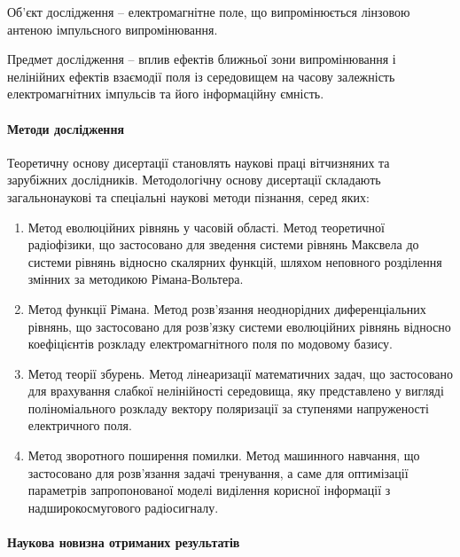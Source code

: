 Об’єкт дослідження -- електромагнітне поле, що випромінюється лінзовою антеною 
імпульсного випромінювання.

Предмет дослідження -- вплив ефектів ближньої зони випромінювання і нелінійних 
ефектів взаємодії поля із середовищем на часову залежність
електромагнітних імпульсів та його інформаційну ємність.

\paragraph{Методи дослідження}

Теоретичну основу дисертації становлять наукові праці вітчизняних та 
зарубіжних дослідників. Методологічну основу дисертації складають 
загальнонаукові та спеціальні наукові методи пізнання, серед яких:

\begin{enumerate}

\item Метод еволюційних рівнянь у часовій області. Метод теоретичної 
радіофізики, що застосовано для зведення системи рівнянь Максвела до 
системи рівнянь відносно скалярних функцій, шляхом неповного розділення 
змінних за методикою Рімана-Вольтера.

\item Метод функції Рімана. Метод розв'язання неоднорідних 
диференціальних рівнянь, що застосовано для розв'язку системи еволюційних 
рівнянь відносно коефіцієнтів розкладу електромагнітного поля по модовому 
базису.

\item Метод теорії збурень. Метод лінеаризації математичних задач, що 
застосовано для врахування слабкої нелінійності середовища, яку представлено 
у вигляді поліноміального розкладу вектору поляризації за ступенями 
напруженості електричного поля.

\item Метод зворотного поширення помилки. Метод машинного навчання,
що застосовано для розв'язання задачі тренування, а саме для 
оптимізації параметрів запропонованої моделі виділення корисної 
інформації з надширокосмугового радіосигналу.

\end{enumerate}

\paragraph{Наукова новизна отриманих результатів}

